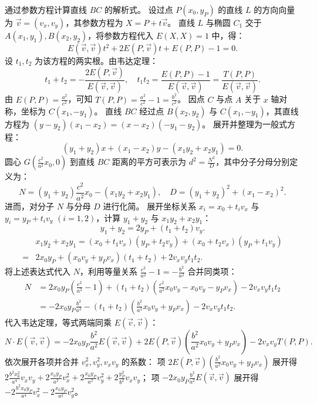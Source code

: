\begin{solution}
通过参数方程计算直线 $BC$ 的解析式。
设过点 $P(x_0, y_P)$ 的直线 $L$ 的方向向量为 $\vec{v} = (v_x, v_y)$，其参数方程为 $X = P + t\vec{v}$。
直线 $L$ 与椭圆 $C_1$ 交于 $A(x_1, y_1), B(x_2, y_2)$，将参数方程代入 $E(X, X) = 1$ 中，得：
\[
E(\vec{v}, \vec{v}) t^2 + 2E(P, \vec{v}) t + E(P, P) - 1 = 0.
\]
设 $t_1, t_2$ 为该方程的两实根。由韦达定理：
\[
t_1 + t_2 = -\frac{2E(P, \vec{v})}{E(\vec{v}, \vec{v})}, \quad t_1 t_2 = \frac{E(P, P) - 1}{E(\vec{v}, \vec{v})} = \frac{T(P, P)}{E(\vec{v}, \vec{v})}.
\]
由 $E(P, P) = \frac{a^2}{c^2}$，可知 $T(P, P) = \frac{a^2}{c^2} - 1 = \frac{b^2}{c^2}$。
因点 $C$ 与点 $A$ 关于 $x$ 轴对称，坐标为 $C(x_1, -y_1)$。
直线 $BC$ 经过点 $B(x_2, y_2)$ 与 $C(x_1, -y_1)$，其直线方程为 $(y - y_2)(x_1 - x_2) = (x - x_2)(-y_1 - y_2)$。
展开并整理为一般式方程：
\[
(y_1 + y_2)x + (x_1 - x_2)y - (x_1 y_2 + x_2 y_1) = 0.
\]
圆心 $G\left(\frac{c^2}{a^2} x_0, 0\right)$ 到直线 $BC$ 距离的平方可表示为 $d^2 = \frac{N^2}{D}$，其中分子分母分别定义为：
\[
N = (y_1 + y_2) \frac{c^2}{a^2} x_0 - (x_1 y_2 + x_2 y_1), \quad D = (y_1 + y_2)^2 + (x_1 - x_2)^2.
\]
进而，对分子 $N$ 与分母 $D$ 进行化简。
展开坐标关系 $x_i = x_0 + t_i v_x$ 与 $y_i = y_P + t_i v_y$ $(i=1, 2)$，计算 $y_1 + y_2$ 与 $x_1 y_2 + x_2 y_1$：
\[
y_1 + y_2 = 2y_P + (t_1 + t_2)v_y.
\]
\begin{align*}
&x_1 y_2 + x_2 y_1 = (x_0 + t_1 v_x)(y_P + t_2 v_y) + (x_0 + t_2 v_x)(y_P + t_1 v_y)\\
 =& 2x_0 y_P + (x_0 v_y + y_P v_x)(t_1 + t_2) + 2 v_x v_y t_1 t_2.
\end{align*}
将上述表达式代入 $N$，利用等量关系 $\frac{c^2}{a^2} - 1 = -\frac{b^2}{a^2}$ 合并同类项：
\begin{align*}
N &= 2x_0 y_P \left(\frac{c^2}{a^2} - 1\right) + (t_1 + t_2) \left( \frac{c^2}{a^2} x_0 v_y - x_0 v_y - y_P v_x \right) - 2 v_x v_y t_1 t_2 \\
&= -2x_0 y_P \frac{b^2}{a^2} - (t_1 + t_2) \left( \frac{b^2}{a^2} x_0 v_y + y_P v_x \right) - 2 v_x v_y t_1 t_2.
\end{align*}
代入韦达定理，等式两端同乘 $E(\vec{v}, \vec{v})$：
\[
N \cdot E(\vec{v}, \vec{v}) = -2x_0 y_P \frac{b^2}{a^2} E(\vec{v}, \vec{v}) + 2 E(P, \vec{v}) \left( \frac{b^2}{a^2} x_0 v_y + y_P v_x \right) - 2 v_x v_y T(P, P).
\]
依次展开各项并合并 $v_x^2, v_y^2, v_x v_y$ 的系数：
项 $2 E(P, \vec{v}) \left( \frac{b^2}{a^2} x_0 v_y + y_P v_x \right)$ 展开得 $2 \frac{b^2 x_0^2}{a^4} v_x v_y + 2 \frac{x_0 y_P}{a^2} v_x^2 + 2 \frac{x_0 y_P}{a^2} v_y^2 + 2 \frac{y_P^2}{b^2} v_x v_y$；
项 $-2x_0 y_P \frac{b^2}{a^2} E(\vec{v}, \vec{v})$ 展开得 $-2 \frac{b^2 x_0 y_P}{a^4} v_x^2 - 2 \frac{x_0 y_P}{a^2} v_y^2$。

\end{solution}
